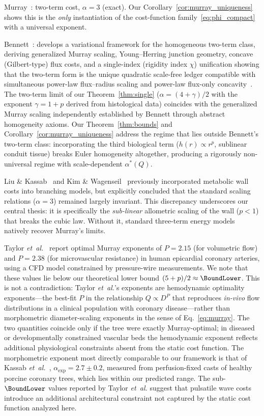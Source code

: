 \documentclass[11pt,a4paper]{article}
\theoremstyle{remark}
\begin{document}
Murray~\cite{Murray1926}: two-term cost, $\alpha=3$ (exact).
Our Corollary~\ref{cor:murray_uniqueness} shows this is the \emph{only}
instantiation
of the cost-function family~\eqref{eq:phi_compact} with a universal exponent.

Bennett~\cite{bennett2025}: develops a variational framework
for the homogeneous two-term class, deriving generalized Murray scaling,
Young--Herring junction geometry, concave (Gilbert-type) flux costs,
and a single-index (rigidity index $\chi$) unification showing that
the two-term form is the unique quadratic scale-free ledger compatible
with simultaneous power-law flux--radius scaling and power-law
flux-only concavity~\cite{bennett2025}.
The two-term limit of our Theorem~\ref{thm:single}
($\alpha = (4{+}\gamma)/2$ with the exponent $\gamma=1+p$ derived from
histological data)
coincides with the generalized Murray scaling independently established
by Bennett through abstract homogeneity axioms.
Our Theorem~\ref{thm:bounds} and Corollary~\ref{cor:murray_uniqueness}
address the regime that lies outside Bennett's two-term class:
incorporating the third biological term ($h(r) \propto r^p$, sublinear
conduit tissue) breaks Euler homogeneity altogether, producing
a rigorously non-universal regime with scale-dependent $\alpha^*(Q)$.

Liu \& Kassab~\cite{LiuKassab2007} and Kim \& Wagenseil~\cite{Kim2015}
previously incorporated metabolic wall costs into branching models, but
explicitly concluded that the standard scaling relations ($\alpha=3$) remained
largely invariant. This discrepancy underscores our central thesis: it is
specifically the \emph{sub-linear} allometric scaling of the wall ($p < 1$) that
breaks the cubic law. Without it, standard three-term energy models natively
recover Murray's limits.

Taylor \textit{et~al.}~\cite{Taylor2022} report optimal Murray exponents of $P =
2.15$ (for volumetric flow) and $P = 2.38$ (for microvascular resistance) in
human epicardial coronary arteries, using a CFD model constrained by
pressure-wire measurements. We note that these values lie below our theoretical
lower bound $(5 + p)/2 \approx \BoundLower$. This is not a contradiction: Taylor
\textit{et~al.}'s exponents are hemodynamic optimality exponents---the best-fit
$P$ in the relationship $Q \propto D^P$ that reproduces \textit{in-vivo} flow
distributions in a clinical population with coronary disease---rather than
morphometric diameter-scaling exponents in the sense of Eq.~\eqref{eq:murray}.
The two quantities coincide only if the tree were exactly Murray-optimal; in
diseased or developmentally constrained vascular beds the hemodynamic exponent
reflects additional physiological constraints absent from the static cost
function. The morphometric exponent most directly comparable to our framework is
that of Kassab \textit{et~al.}~\cite{Kassab1993}, $\alpha_\mathrm{exp} = 2.7 \pm
0.2$, measured from perfusion-fixed casts of healthy porcine coronary trees,
which lies within our predicted range. The sub-$\BoundLower$ values reported by
Taylor \textit{et~al.} suggest that pulsatile wave costs introduce an additional
architectural constraint not captured by the static cost function analyzed here.
\end{document}
